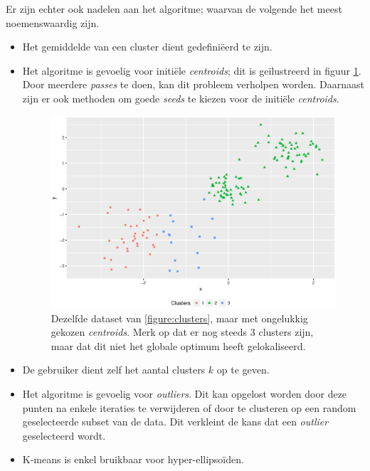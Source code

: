 Er zijn echter ook nadelen aan het algoritme; waarvan de volgende het meest noemenswaardig zijn. 

\begin{itemize}
\item Het gemiddelde van een cluster dient gedefini\"eerd te zijn. 
\item Het algoritme is gevoelig voor initi\"ele \emph{centroids}; dit is ge\"ilustreerd in figuur \ref{figure:clusters_kmeans_wrong_seed}. Door meerdere \emph{passes} te doen, kan dit probleem verholpen worden. Daarnaast zijn er ook methoden om goede \emph{seeds} te kiezen voor de initi\"ele \emph{centroids}.

\begin{figure}
\centering
\caption{Dezelfde dataset van \ref{figure:clusters}, maar met ongelukkig gekozen \emph{centroids}. Merk op dat er nog steeds 3 clusters zijn, maar dat dit niet het globale optimum heeft gelokaliseerd. }
\label{figure:clusters_kmeans_wrong_seed}
\includegraphics[width=\textwidth]{res/ch4_kmeans_wrong_seed.eps}
\end{figure}

\item De gebruiker dient zelf het aantal clusters $k$ op te geven.
\item Het algoritme is gevoelig voor \emph{outliers}. Dit kan opgelost worden door deze punten na enkele iteraties te verwijderen of door te clusteren op een random geselecteerde subset van de data. Dit verkleint de kans dat een \emph{outlier} geselecteerd wordt. 
\item K-means is enkel bruikbaar voor hyper-ellipso\"iden.



\end{itemize}
